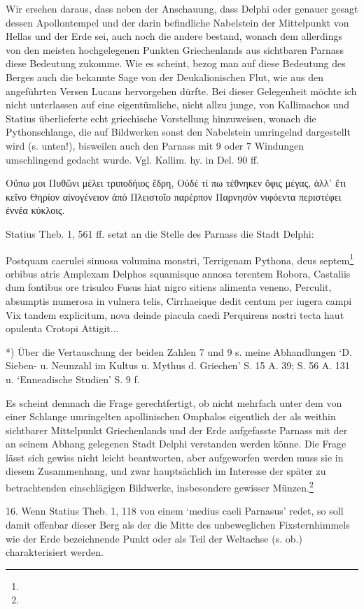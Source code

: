 \documentclass[a4paper, 11pt, oneside]{article}
\begin{document}
Wir ersehen daraus, dass neben der Anschauung, dass Delphi oder genauer gesagt dessen Apollontempel und der darin befindliche Nabelstein der Mittelpunkt von Hellas und der Erde sei, auch noch die andere bestand, wonach dem allerdings von den meisten hochgelegenen Punkten Griechenlands aus sichtbaren Parnass diese Bedeutung zukomme. Wie es scheint, bezog man auf diese Bedeutung des Berges auch die bekannte Sage von der Deukalionischen Flut, wie aus den angeführten Versen Lucans hervorgehen dürfte. Bei dieser Gelegenheit möchte ich nicht unterlassen auf eine eigentümliche, nicht allzu junge, von Kallimachos und Statius überlieferte echt griechische Vorstellung hinzuweisen, wonach die Pythonschlange, die auf Bildwerken sonst den Nabelstein umringelnd dargestellt wird (s. unten!), bisweilen auch den Parnass mit 9 oder 7 Windungen umschlingend gedacht wurde. Vgl. Kallim. hy. in Del. 90 ff.

Οὔπω μοι Πυθῶνι μέλει τριποδήιος ἕδρη,  
Οὐδέ τί πω τέθνηκεν ὄφις μέγας, ἀλλ᾽ ἔτι κεῖνο  
Θηρίον αἰνογένειον ἀπὸ Πλειστοῖο παρέρπον  
Παρνησὸν νιφόεντα περιστέφει ἐννέα κύκλοις.

Statius Theb. 1, 561 ff. setzt an die Stelle des Parnass die Stadt Delphi:

Postquam caerulei sinuosa volumina monstri,  Terrigenam Pythona, deus septem\footnote{} orbibus atris  Amplexam Delphos squamisque annosa terentem  Robora, Castaliis dum fontibus ore trisulco  Fusus hiat nigro sitiens alimenta veneno,  Perculit, absumptis numerosa in vulnera telis,  Cirrhaeique dedit centum per iugera campi  Vix tandem explicitum, nova deinde piacula caedi  Perquirens nostri tecta haut opulenta Crotopi  Attigit...

*) Über die Vertauschung der beiden Zahlen 7 und 9 s. meine Abhandlungen `D. Sieben- u. Neunzahl im Kultus u. Mythus d. Griechen' S. 15 A. 39; S. 56 A. 131 u. `Enneadische Studien' S. 9 f.

Es scheint demnach die Frage gerechtfertigt, ob nicht mehrfach unter dem von einer Schlange umringelten apollinischen Omphalos eigentlich der als weithin sichtbarer Mittelpunkt Griechenlands und der Erde aufgefasste Parnass mit der an seinem Abhang gelegenen Stadt Delphi verstanden werden könne. Die Frage lässt sich gewiss nicht leicht beantworten, aber aufgeworfen werden muss sie in diesem Zusammenhang, und zwar hauptsächlich im Interesse der später zu betrachtenden einschlägigen Bildwerke, insbesondere gewisser Münzen.\footnote{}

16. Wenn Statius Theb. 1, 118 von einem `medius caeli Parnasus' redet, so soll damit offenbar dieser Berg als der die Mitte des unbeweglichen Fixsternhimmels wie der Erde bezeichnende Punkt oder als Teil der Weltachse (s. ob.) charakterisiert werden.
\end{document}
